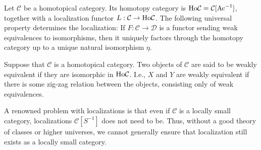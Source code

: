 \documentclass[../thesis.tex]{subfiles}
\begin{document}
            \begin{definition}
                Let $\mathcal{C}$ be a homotopical category. Its homotopy category is $\tt{Ho}\mathcal{C} = \mathcal{C}[\tt{Ac}^{-1}]$, together with a localization functor $L:\mathcal{C}\rightarrow \tt{Ho}\mathcal{C}$. The following universal property determines the localization: If $F:\mathcal{C}\rightarrow \mathcal{D}$ is a functor sending weak equivalences to isomorphisms, then it uniquely factors through the homotopy category up to a unique natural isomorphism $\eta$.

                \begin{center}
                \end{center}
            \end{definition}

            \begin{definition}
                Suppose that $\mathcal{C}$ is a homotopical category. Two objects of $\mathcal{C}$ are said to be weakly equivalent if they are isomorphic in $\tt{Ho}\mathcal{C}$. I.e., $X$ and $Y$ are weakly equivalent if there is some zig-zag relation between the objects, consisting only of weak equivalences.
                \begin{center}
                \end{center}
            \end{definition}

            \begin{remark}
                A renowned problem with localizations is that even if $\mathcal{C}$ is a locally small category, localizations $\mathcal{C}[S^{-1}]$ does not need to be. Thus, without a good theory of classes or higher universes, we cannot generally ensure that localization still exists as a locally small category.
            \end{remark}
\end{document}
